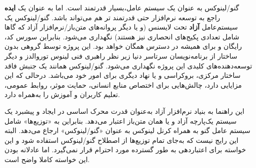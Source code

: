 گنو/لینوکس به عنوان یک سیستم عامل،بسیار قدرتمند است. اما به عنوان یک
{\bfseries ایده}
راجع به توسعه نرم‌افزار حتی قدرتمند تر هم می‌تواند باشد. گنو/لینوکس یک سیستم‌عامل
{\bfseries آزاد}
تحت لایسنس
(و یا دیگر پروانه‌های متن‌باز/نرم‌افزار آزاد که گاها شامل تعدادی پکیج‌های انحصاری نیز هستند) 
نگهداری می‌شود. بنابراین سورس کد، رایگان و برای همیشه در دسترس همگان خواهد بود.
این پروژه توسط گروهی بدون ساختار از برنامه‌نویسان سرتاسر دنیا زیر نظر راهبری فنی
لینوس توروالدز و دیگر توسعه‌دهنده‌های کلیدی این پروژه نگهداری می‌شود.
گنو/لینوکس همانند یک جنبش فاقد ساختار مرکزی، بروکراسی و یا نهاد دیگری برای امور خود می‌باشد.
درحالی که این مزایایی دارد، چالش‌هایی برای اختصاص منابع انسانی، حمایت موثر، روابط عمومی،
تعلیم کاربران و آموزش را به‌همراه دارد.

\begin{note}
این راهنما به بنیاد نرم‌افزار آزاد
به‌عنوان قدرت محرک اساسی در ایجاد و پیشبرد یک سیستم یک‌پارچه آزاد و یا همان متن‌باز اعتبار می‌دهد.
بنابراین به «توزیع‌ها» شامل سیستم عامل گنو به همراه کرنل لینوکس به عنوان «گنو/لینوکس» ارجاع می‌دهد.
البته این رایج نیست که به‌جای تمام توزیع‌ها از اصطلاح گنو/لینوکس استفاده شود و این خواسته
برای اعتباردهی به طور گسترده مورد احترام قرار نمی‌گیرد. اما عادلانه بودن این خواسته کاملا واضح است.
\end{note}


